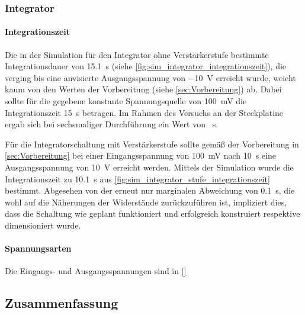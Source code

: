 \documentclass[12pt,english,ngerman]{scrartcl}
\begin{document}
\subsubsection{Integrator}
\paragraph{Integrationszeit}
Die in der Simulation für den Integrator ohne Verstärkerstufe bestimmte
Integrationsdauer von \SI{15,1}{\second} (siehe
\autoref{fig:sim_integrator_integrationszeit}), die verging bis eine anvisierte
Ausgangsspannung von \SI{-10}{\volt} erreicht wurde, weicht kaum von den Werten
der Vorbereitung (siehe \autoref{sec:Vorbereitung}) ab. Dabei sollte für die
gegebene konstante Spannungsquelle von \SI{100}{\milli\volt} die
Integrationszeit \SI{15}{\second} betragen. Im Rahmen des Versuchs an der
Steckplatine ergab sich bei sechsmaliger Durchführung ein Wert von
\SI{}{\second}.

Für die Integratorschaltung mit Verstärkerstufe sollte gemäß der Vorbereitung
in \autoref{sec:Vorbereitung} bei einer Eingangsspannung von
\SI{100}{\milli\volt} nach \SI{10}{\second} eine Ausgangsspannung von
\SI{10}{\volt} erreicht werden. Mittels der Simulation wurde die
Integrationszeit zu \SI{10,1}{\second} aus
\autoref{fig:sim_integrator_stufe_integrationszeit} bestimmt. Abgesehen von der
erneut nur marginalen Abweichung von \SI{0,1}{\second}, die wohl auf die
Näherungen der Widerstände zurückzuführen ist, impliziert dies, dass die
Schaltung wie geplant funktioniert und erfolgreich konstruiert respektive
dimensioniert wurde.

\paragraph{Spannungsarten}
Die Eingangs- und Ausgangsspannungen sind in \autoref{} 





\subsection{Zusammenfassung}

\newpage

\printbibliography

\listoffigures

\listoftables
\end{document}
